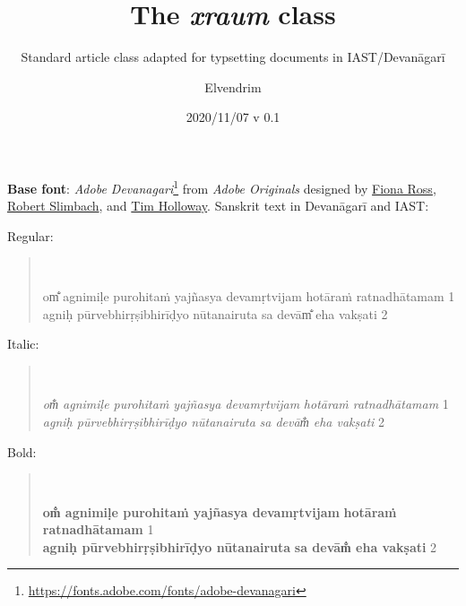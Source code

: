 \documentclass[12pt,oneside,a4paper]{xraum}
\title{The \textit{xraum} class}
\subtitle{Standard article class adapted for typsetting documents in IAST/Devanāgarī}
\author{Elvendrim}
\date{\small{2020/11/07 v 0.1}}
\begin{document}
\maketitle
\bigskip
\thispagestyle{empty}

\textbf{Base font}:
\textit{Adobe Devanagari}\footnote{\url{https://fonts.adobe.com/fonts/adobe-devanagari}}
from \textit{Adobe Originals} designed by
\href{https://fonts.adobe.com/designers/fiona-ross}{Fiona Ross},
\href{https://fonts.adobe.com/designers/robert-slimbach}{Robert Slimbach},
and \href{https://fonts.adobe.com/designers/tim-holloway}{Tim Holloway}.
Sanskrit text in Devanāgarī and IAST:

Regular:

\begin{quote}
\\

om̐ agnimiḷe purohitaṁ yajñasya devamṛtvijam 
hotāraṁ ratnadhātamam  1\\
agniḥ pūrvebhirṛṣibhirīḍyo nūtanairuta 
sa devām̐ eha vakṣati  2
\end{quote}

Italic:

\begin{quote}
\textit{}\\
\textit{}

\textit{om̐ agnimiḷe purohitaṁ yajñasya devamṛtvijam} 
\textit{hotāraṁ ratnadhātamam}  1\\
\textit{agniḥ pūrvebhirṛṣibhirīḍyo nūtanairuta} 
\textit{sa devām̐ eha vakṣati}  2
\end{quote}

Bold:

\begin{quote}
\textbf{}\\
\textbf{}

\textbf{om̐ agnimiḷe purohitaṁ yajñasya devamṛtvijam} 
\textbf{hotāraṁ ratnadhātamam}  1\\
\textbf{agniḥ pūrvebhirṛṣibhirīḍyo nūtanairuta} 
\textbf{sa devām̐ eha vakṣati}  2
\end{quote}
\end{document}
